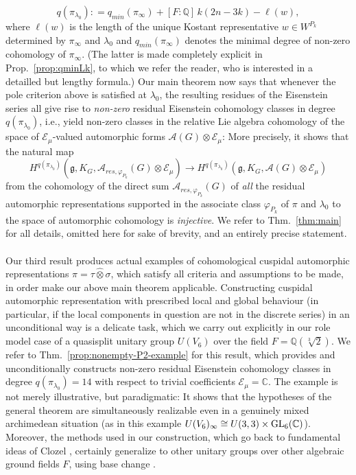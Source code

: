 \documentclass[a4paper,10pt]{amsart}
\theoremstyle{definition}
\numberwithin{equation}{section}
\def\Q{\mathbb Q}
\def\C{\mathbb C}
\def\EE{\mathcal E}
\def\g{\mathfrak g}
\def\GL{{\rm GL}}
\begin{document}
$$
        q(\pi_{\lambda_0}):
        =
        q_{min}(\pi_\infty)
        +[F:\mathbb Q]\,k(2n-3k)-\ell(w),
$$
where $\ell(w)$ is the length of the unique Kostant representative \(w\in W^{P_k}\) determined by $\pi_\infty$ and $\lambda_0$ and $q_{min}(\pi_\infty)$ denotes the minimal degree of non-zero cohomology of $\pi_\infty$. (The latter is made completely explicit in Prop.\ \ref{prop:qminLk}, to which we refer the reader, who is interested in a detailled but lengthy formula.) Our main theorem now says that whenever the pole criterion above is satisfied at \(\lambda_0\), the resulting residues of the Eisenstein series all give rise to {\it non-zero} residual Eisenstein cohomology classes in degree \(q(\pi_{\lambda_0})\), i.e., yield non-zero classes in the relative Lie algebra cohomology of the space of $\EE_\mu$-valued automorphic forms $\mathcal A(G)\otimes\EE_\mu$: More precisely, it shows that the natural map 
$$H^{q(\pi_{\lambda_0})}(\g,K_G,\mathcal A_{res,\varphi_{P_k}}(G)\otimes\EE_\mu)\longrightarrow H^{q(\pi_{\lambda_0})}(\g,K_G,\mathcal A(G)\otimes\EE_\mu)$$
from the cohomology of the direct sum $\mathcal A_{res,\varphi_{P_k}}(G)$ of {\it all} the residual automorphic representations supported in the associate class $\varphi_{P_k}$ of $\pi$ and $\lambda_0$ to the space of automorphic cohomology is {\it injective}. We refer to Thm.\ \ref{thm:main} for all details, omitted here for sake of brevity, and an entirely precise statement.\\\\
Our third result produces actual examples of cohomological cuspidal automorphic representations $\pi=\tau\widehat\otimes\sigma$, which satisfy all criteria and assumptions to be made, in order make our above main theorem applicable. Constructing cuspidal automorphic representation with prescribed local and global behaviour (in particular, if the local components in question are not in the discrete series) in an unconditional way is a delicate task, which we carry out explicitly in our role model case of a quasisplit unitary group $U(V_6)$ over the field $F=\Q(\sqrt[3]{2})$. We refer to Thm.\ \ref{prop:nonempty-P2-example} for this result, which provides and unconditionally constructs non-zero residual Eisenstein cohomology classes in degree $q(\pi_{\lambda_0})=14$ with respect to trivial coefficients $\EE_\mu=\C$. The example is not merely illustrative, but paradigmatic: It shows that the hypotheses of the general theorem are simultaneously realizable even in a genuinely mixed archimedean situation (as in this example $U(V_6)_\infty\cong U(3,3)\times \GL_6(\C)$). Moreover, the methods used in our construction, which go back to fundamental ideas of Clozel \cite{clozelSLN}, certainly generalize to other unitary groups over other algebraic ground fields $F$, using base change \cite{mok, KMSW, zou}.\\\\
\end{document}
